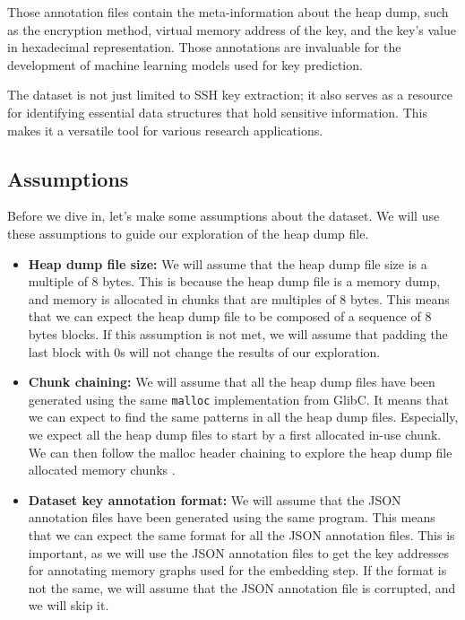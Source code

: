     Those annotation files contain the meta-information about the heap dump, such as the encryption method, virtual memory address of the key, and the key's value in hexadecimal representation. Those annotations are invaluable for the development of machine learning models used for key prediction. 

    The dataset is not just limited to SSH key extraction; it also serves as a resource for identifying essential data structures that hold sensitive information. This makes it a versatile tool for various research applications. 

    \subsection{Assumptions}\label{sec:methods:dataset:assumptions}
    Before we dive in, let's make some assumptions about the dataset. We will use these assumptions to guide our exploration of the heap dump file. 

    \begin{itemize}
        \item \textbf{Heap dump file size:} We will assume that the heap dump file size is a multiple of 8 bytes. This is because the heap dump file is a memory dump, and memory is allocated in chunks that are multiples of 8 bytes. This means that we can expect the heap dump file to be composed of a sequence of 8 bytes blocks. If this assumption is not met, we will assume that padding the last block with 0s will not change the results of our exploration.
        \item \textbf{Chunk chaining:} We will assume that all the heap dump files have been generated using the same \lstinline[language=c]|malloc| implementation from GlibC. It means that we can expect to find the same patterns in all the heap dump files. Especially, we expect all the heap dump files to start by a first allocated in-use chunk. We can then follow the malloc header chaining to explore the heap dump file allocated memory chunks \cite{MallocInternalsWiki2023}.
        \item \textbf{Dataset key annotation format:} We will assume that the JSON annotation files have been generated using the same program. This means that we can expect the same format for all the JSON annotation files. This is important, as we will use the JSON annotation files to get the key addresses for annotating memory graphs used for the embedding step. If the format is not the same, we will assume that the JSON annotation file is corrupted, and we will skip it.
    \end{itemize}

